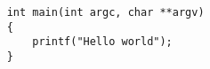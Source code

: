 \begin{verbatim}
    int main(int argc, char **argv)
    {
        printf("Hello world");
    }
\end{verbatim}
